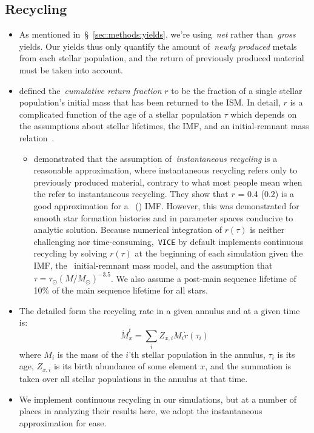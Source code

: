 \documentclass[a4paper, fleqn, usenatbib, useAMS]{mnras}
\begin{document}
\subsection{Recycling} 
\label{sec:methods:recycling} 
\begin{itemize} 
	\item As mentioned in~\S~\ref{sec:methods:yields}, we're using~\textit{net} 
	rather than~\textit{gross} yields. Our yields thus only quantify the amount 
	of~\textit{newly produced} metals from each stellar population, and the 
	return of previously produced material must be taken into account. 

	\item \citet{Weinberg2017} defined the~\textit{cumulative return fraction}
	$r$ to be the fraction of a single stellar population's initial mass that 
	has been returned to the ISM. In detail, $r$ is a complicated function of 
	the age of a stellar population $\tau$ which depends on the assumptions 
	about stellar lifetimes, the IMF, and an initial-remnant mass 
	relation~\citep[e.g.][]{Kalirai2008}. 
	\begin{itemize} 
		\item \citet{Weinberg2017} demonstrated that the assumption 
		of~\textit{instantaneous recycling} is a reasonable approximation, 
		where instantaneous recycling refers only to previously produced 
		material, contrary to what most people mean when the refer to 
		instantaneous recycling. They show that $r$ = 0.4 (0.2) is a good 
		approximation for a~ () 
		IMF. However, this was demonstrated for smooth star formation histories 
		and in parameter spaces conducive to analytic solution. Because 
		numerical integration of $r(\tau)$ is neither challenging nor 
		time-consuming,~\texttt{VICE} by default implements continuous recycling 
		by solving $r(\tau)$ at the beginning of each simulation given the 
		IMF, the~\citet{Kalirai2008} initial-remnant mass model, and the 
		assumption that $\tau = \tau_\odot(M/M_\odot)^{-3.5}$. We also assume 
		a post-main sequence lifetime of 10\% of the main sequence lifetime for 
		all stars. 
	\end{itemize} 

	\item The detailed form the recycling rate in a given annulus and at a 
	given time is: 
	\begin{equation} 
	\dot{M}_x^\text{r} = \sum_i Z_{x,i} M_i \dot{r}(\tau_i) 
	\end{equation} 
	where $M_i$ is the mass of the $i$'th stellar population in the annulus, 
	$\tau_i$ is its age, $Z_{x,i}$ is its birth abundance of some element $x$, 
	and the summation is taken over all stellar populations in the annulus at 
	that time. 

	\item We implement continuous recycling in our simulations, but at a number 
	of places in analyzing their results here, we adopt the instantaneous 
	approximation for ease. 
\end{itemize} 
\end{document}
